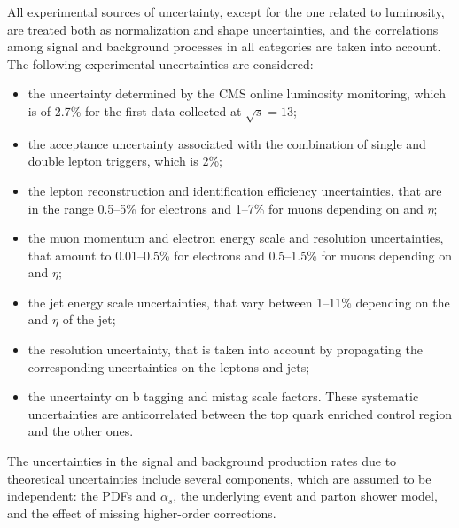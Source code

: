 All experimental sources of uncertainty, except for the one related to luminosity, are treated both as normalization and shape uncertainties, and the correlations among signal and background processes in all categories are taken into account. The following experimental uncertainties are considered:
\begin{itemize}
\item the uncertainty determined by the CMS online luminosity monitoring, which is of 2.7\% for the first data collected at $\sqrt{s}=13$\TeV;
\item the acceptance uncertainty associated with the combination of single and double lepton triggers, which is 2\%;
\item the lepton reconstruction and identification efficiency uncertainties, that are in the range 0.5--5\% for electrons and 1--7\% for muons depending on \pt and $\eta$;
\item the muon momentum and electron energy scale and resolution uncertainties, that amount to 0.01--0.5\% for electrons and 0.5--1.5\% for muons depending on \pt and $\eta$;
\item the jet energy scale uncertainties, that vary between 1--11\% depending on the \pt and $\eta$ of the jet;
\item the \MET resolution uncertainty, that is taken into account by propagating the corresponding uncertainties on the leptons and jets;
\item the uncertainty on b tagging and mistag scale factors. These systematic uncertainties are anticorrelated between the top quark enriched control region and the other ones.
\end{itemize}

The uncertainties in the signal and background production rates due
to theoretical uncertainties include several components, which are assumed to be
independent: the PDFs and $\alpha_{s}$, the underlying event and parton shower model,
and the effect of missing higher-order corrections.

